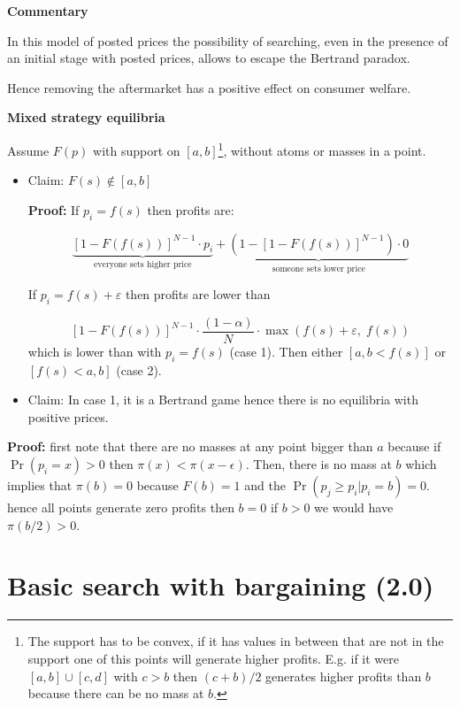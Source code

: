 \documentclass[12pt]{article}
\theoremstyle{plain}
\theoremstyle{plain}
\begin{document}
\textbf{Commentary}

In this model of posted prices the possibility of searching, even in the presence of an initial stage with posted prices,  allows to escape the Bertrand paradox. 

Hence removing the aftermarket has a positive effect on consumer welfare. 


\newpage

\textbf{Mixed strategy equilibria }


Assume $F(p)$ with support on $[a,b]$\footnote{The support has to be convex, if it has values in between that are not in the support one of this points will generate higher profits. E.g. if it were $[a,b] \cup [c,d]$ with $c>b$ then $(c+b)/2$ generates higher profits than $b$ because there can be no mass at $b$.}, without atoms or masses in a point.

\begin{itemize}
    \item Claim: $F(s) \notin [a,b]$
 

\textbf{Proof:} If $p_i = f(s)$ then profits are:

\[
\underbrace{[1 - F(f(s))]^{N-1} \cdot p_i}_{\text{everyone sets higher price}} + 
\underbrace{(1 - \left[1 - F(f(s))\right]^{N-1}) \cdot 0}_{\text{someone sets lower price}}
\]


If $p_i = f(s) + \varepsilon$ then profits are lower than

\[
[1 - F(f(s))]^{N-1} \cdot \frac{(1 - \alpha)}{N} \cdot \max(f(s)+\varepsilon,\; f(s))
\]
which is lower than with  $p_i = f(s)$ (case 1). Then either $[a,b < f(s)]$ or $[f(s)< a,b]$ (case 2). 

\item Claim: In case 1, it is a Bertrand game hence there is no equilibria with positive prices. 
\end{itemize}

\textbf{Proof:} first note that there are no masses at any point bigger than $a$ because if $\Pr(p_i = x) > 0$ then $\pi(x) < \pi(x-\epsilon)$. Then, there is no mass at $b$ which implies that $\pi(b) = 0$ because $F(b) =1 $ and the $\Pr(p_j \geq p_i| p_i = b) =  0 $. hence all points generate zero profits then $b =0 $ if $b> 0$ we would have $\pi(b/2) > 0$. 


\section{Basic search with bargaining (2.0)}
\end{document}
